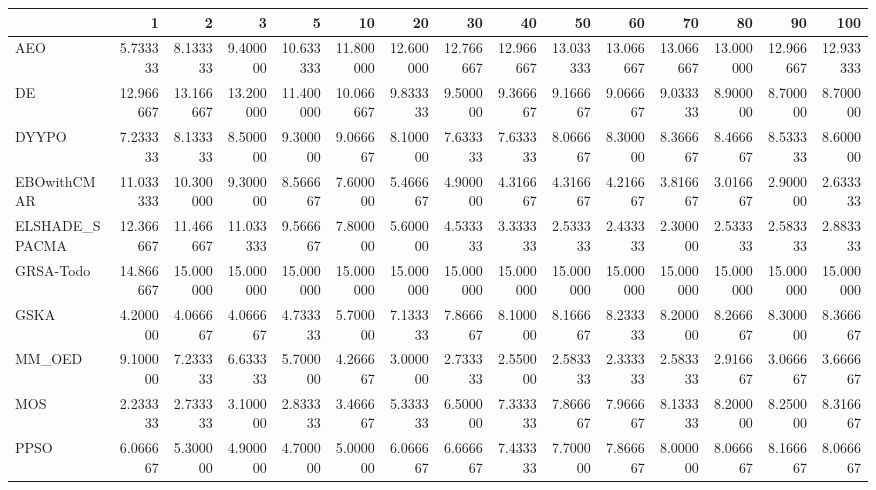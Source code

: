 \begin{tabular}{lrrrrrrrrrrrrrr}
\toprule
{} &        1   &        2   &        3   &        5   &        10  &        20  &        30  &        40  &        50  &        60  &        70  &        80  &        90  &        100 \\
\midrule
AEO            &   5.733333 &   8.133333 &   9.400000 &  10.633333 &  11.800000 &  12.600000 &  12.766667 &  12.966667 &  13.033333 &  13.066667 &  13.066667 &  13.000000 &  12.966667 &  12.933333 \\
DE             &  12.966667 &  13.166667 &  13.200000 &  11.400000 &  10.066667 &   9.833333 &   9.500000 &   9.366667 &   9.166667 &   9.066667 &   9.033333 &   8.900000 &   8.700000 &   8.700000 \\
DYYPO          &   7.233333 &   8.133333 &   8.500000 &   9.300000 &   9.066667 &   8.100000 &   7.633333 &   7.633333 &   8.066667 &   8.300000 &   8.366667 &   8.466667 &   8.533333 &   8.600000 \\
EBOwithCMAR    &  11.033333 &  10.300000 &   9.300000 &   8.566667 &   7.600000 &   5.466667 &   4.900000 &   4.316667 &   4.316667 &   4.216667 &   3.816667 &   3.016667 &   2.900000 &   2.633333 \\
ELSHADE\_SPACMA &  12.366667 &  11.466667 &  11.033333 &   9.566667 &   7.800000 &   5.600000 &   4.533333 &   3.333333 &   2.533333 &   2.433333 &   2.300000 &   2.533333 &   2.583333 &   2.883333 \\
GRSA-Todo      &  14.866667 &  15.000000 &  15.000000 &  15.000000 &  15.000000 &  15.000000 &  15.000000 &  15.000000 &  15.000000 &  15.000000 &  15.000000 &  15.000000 &  15.000000 &  15.000000 \\
GSKA           &   4.200000 &   4.066667 &   4.066667 &   4.733333 &   5.700000 &   7.133333 &   7.866667 &   8.100000 &   8.166667 &   8.233333 &   8.200000 &   8.266667 &   8.300000 &   8.366667 \\
MM\_OED         &   9.100000 &   7.233333 &   6.633333 &   5.700000 &   4.266667 &   3.000000 &   2.733333 &   2.550000 &   2.583333 &   2.333333 &   2.583333 &   2.916667 &   3.066667 &   3.666667 \\
MOS            &   2.233333 &   2.733333 &   3.100000 &   2.833333 &   3.466667 &   5.333333 &   6.500000 &   7.333333 &   7.866667 &   7.966667 &   8.133333 &   8.200000 &   8.250000 &   8.316667 \\
PPSO           &   6.066667 &   5.300000 &   4.900000 &   4.700000 &   5.000000 &   6.066667 &   6.666667 &   7.433333 &   7.700000 &   7.866667 &   8.000000 &   8.066667 &   8.166667 &   8.066667 \\

\end{tabular}
